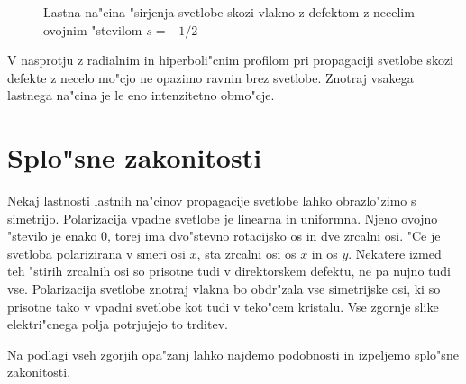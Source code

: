 \documentclass[12pt,twoside,openright,final]{report}
\begin{document}
\begin{figure}[!htbp]
 \centering
 \caption{Lastna na"cina "sirjenja svetlobe skozi vlakno z defektom z necelim ovojnim "stevilom $s=-1/2$}
 \label{fig:pulse-m12-mode}
\end{figure}

V nasprotju z radialnim in hiperboli"cnim profilom pri propagaciji svetlobe skozi defekte z necelo mo"cjo ne opazimo ravnin brez svetlobe. 
Znotraj vsakega lastnega na"cina je le eno intenzitetno obmo"cje. 

\section{Splo"sne zakonitosti}
Nekaj lastnosti lastnih na"cinov propagacije svetlobe lahko obrazlo"zimo s simetrijo. 
Polarizacija vpadne svetlobe je linearna in uniformna. 
Njeno ovojno "stevilo je enako 0, torej ima dvo"stevno rotacijsko os in dve zrcalni osi. 
"Ce je svetloba polarizirana v smeri osi $x$, sta zrcalni osi os $x$ in os $y$. 
Nekatere izmed teh "stirih zrcalnih osi so prisotne tudi v direktorskem defektu, ne pa nujno tudi vse. 
Polarizacija svetlobe znotraj vlakna bo obdr"zala vse simetrijske osi, ki so prisotne tako v vpadni svetlobe kot tudi v teko"cem kristalu. 
Vse zgornje slike elektri"cnega polja potrjujejo to trditev. 

Na podlagi vseh zgorjih opa"zanj lahko najdemo podobnosti in izpeljemo splo"sne zakonitosti. 
\end{document}
